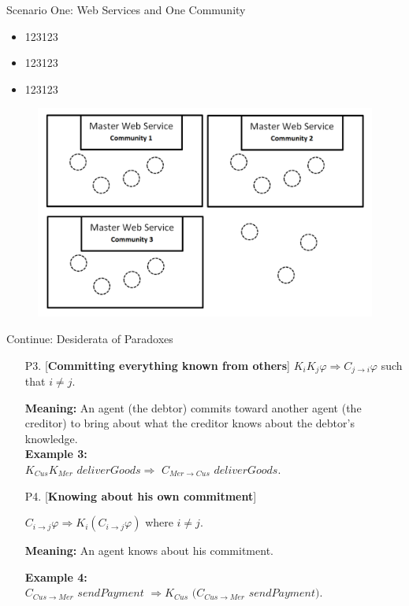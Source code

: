\documentclass{beamer}
\begin{document}
\begin{frame}{Scenario One: Web Services and One Community}
    \begin{itemize}
        \item 123123
        \item 123123
        \item 123123
    \end{itemize}
    \begin{figure}[htbp]
        \centering
        \includegraphics[width=0.8 \columnwidth]{figures/scenario2.png}
    \end{figure}
       	
\end{frame}

\begin{frame}{Continue: Desiderata of Paradoxes}
 \begin{enumerate}
\vspace{0.2cm} \item [P3.][\textbf{Committing everything known
from others}]
$ K_i K_j \varphi \Rightarrow C_{j \rightarrow i} \varphi$ such that $ i \neq j$.

\textbf{Meaning:} An agent (the debtor) commits toward another
agent (the creditor) to bring about what the creditor knows about
the debtor's knowledge.\\
\textbf{Example 3:}\\
$K_{Cus} K_{Mer}$ $deliverGoods \Rightarrow$ $C_{Mer \rightarrow Cus}$
$deliverGoods$.

\vspace{0.2cm} \item [P4.][\textbf{Knowing about his own
commitment}]

$C_{i\rightarrow j} \varphi \Rightarrow K_i (C_{i\rightarrow j}
\varphi) $ where $i \neq j$.

\textbf{Meaning:} An agent knows about his commitment.


\textbf{Example 4:}\\
$C_{Cus \rightarrow Mer}$ $sendPayment $ $\Rightarrow K_{Cus}$ $(C_{Cus \rightarrow Mer}$ $sendPayment)$.
\end{enumerate}

        	
\end{frame}
\end{document}
